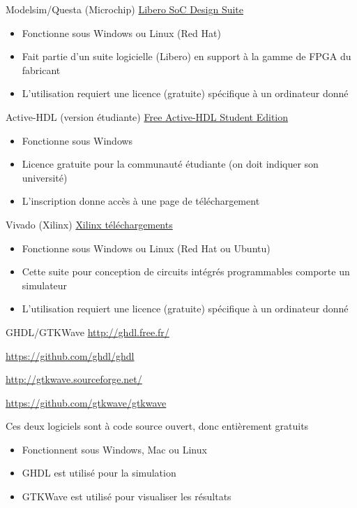 \documentclass[presentation]{beamer}
\begin{document}
\begin{frame}[label={sec:orge5d502e}]{Modelsim/Questa (Microchip)}
\href{https://www.microchip.com/en-us/products/fpgas-and-plds/fpga-and-soc-design-tools/fpga/libero-software-later-versions\#downloads}{Libero SoC Design Suite}

\begin{itemize}
\item Fonctionne sous Windows ou Linux (Red Hat)
\item Fait partie d'un suite logicielle (Libero) en support à la gamme de FPGA du fabricant
\item L'utilisation requiert une licence (gratuite) spécifique à un ordinateur donné
\end{itemize}
\end{frame}

\begin{frame}[label={sec:orga87b226}]{Active-HDL (version étudiante)}
\href{https://www.aldec.com/en/products/fpga\_simulation/active\_hdl\_student}{Free Active-HDL Student Edition}

\begin{itemize}
\item Fonctionne sous Windows
\item Licence gratuite pour la communauté étudiante (on doit indiquer son université)
\item L'inscription donne accès à une page de téléchargement
\end{itemize}
\end{frame}

\begin{frame}[label={sec:org7f97c36}]{Vivado (Xilinx)}
\href{https://www.xilinx.com/support/download.html}{Xilinx téléchargements}

\begin{itemize}
\item Fonctionne sous Windows ou Linux (Red Hat ou Ubuntu)
\item Cette suite pour conception de circuits intégrés programmables comporte un simulateur
\item L'utilisation requiert une licence (gratuite) spécifique à un ordinateur donné
\end{itemize}
\end{frame}

\begin{frame}[label={sec:orga68bd2c}]{GHDL/GTKWave}
\url{http://ghdl.free.fr/}

\url{https://github.com/ghdl/ghdl}

\url{http://gtkwave.sourceforge.net/}

\url{https://github.com/gtkwave/gtkwave}

Ces deux logiciels sont à code source ouvert, donc entièrement gratuits

\begin{itemize}
\item Fonctionnent sous Windows, Mac ou Linux
\item GHDL est utilisé pour la simulation
\item GTKWave est utilisé pour visualiser les résultats
\end{itemize}
\end{frame}
\end{document}
